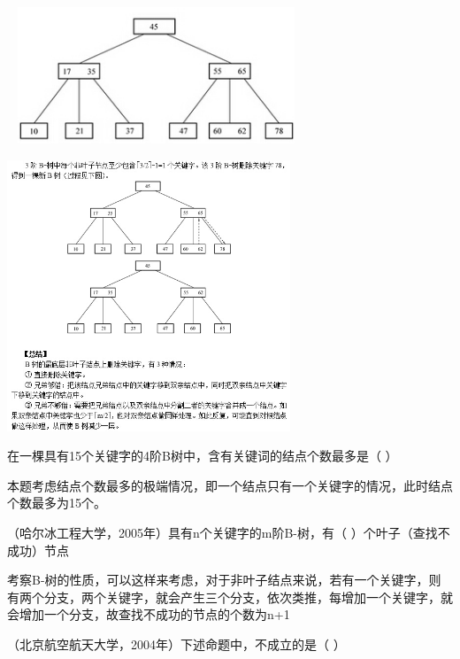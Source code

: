 ~
\includegraphics[width=3.26042in,height=1.60417in]{computerassets/04c0e2e1f321e7045cd7b9c52c54a6a8.jpeg}
\par{}
\begin{solution}\includegraphics[width=3.33333in,height=3.18750in]{computerassets/ffad7e44985976db5df9f2ad0d25a55c.jpeg}
\end{solution}
\question 在一棵具有15个关键字的4阶B树中，含有关键词的结点个数最多是（ ）
\par{}
\begin{solution}本题考虑结点个数最多的极端情况，即一个结点只有一个关键字的情况，此时结点个数最多为15个。
\end{solution}
\question （哈尔冰工程大学，2005年）具有n个关键字的m阶B-树，有（
）个叶子（查找不成功）节点
\par{}
\begin{solution}考察B-树的性质，可以这样来考虑，对于非叶子结点来说，若有一个关键字，则有两个分支，两个关键字，就会产生三个分支，依次类推，每增加一个关键字，就会增加一个分支，故查找不成功的节点的个数为n+1
\end{solution}
\question （北京航空航天大学，2004年）下述命题中，不成立的是（ ）
\par{}
